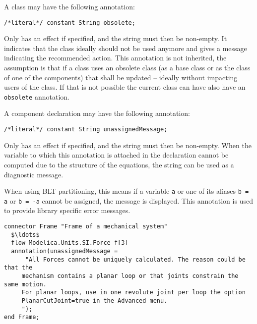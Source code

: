A class may have the following annotation:
\begin{lstlisting}[language=modelica]
/*literal*/ constant String obsolete;
\end{lstlisting}%

Only has an effect if specified, and the string must then be non-empty.
It indicates that the class ideally should not be used anymore and gives a message indicating the recommended action.
This annotation is not inherited, the assumption is that if a class uses an obsolete class (as a base class or as the class of one of the components) that shall be updated -- ideally without impacting users of the class.
If that is not possible the current class can have also have an \lstinline!obsolete! annotation.

A component declaration may have the following annotation:
\begin{lstlisting}[language=modelica]
/*literal*/ constant String unassignedMessage;
\end{lstlisting}%

Only has an effect if specified, and the string must then be non-empty.
When the variable to which this annotation is attached in the declaration cannot be computed due to the structure of the equations, the string can be used as a diagnostic message.

\begin{nonnormative}
When using BLT partitioning, this means if a variable \lstinline!a! or one of its aliases \lstinline!b = a! or \lstinline!b = -a! cannot be assigned, the message is displayed.
This annotation is used to provide library specific error messages.
\end{nonnormative}

\begin{example}
\begin{lstlisting}[language=modelica]
connector Frame "Frame of a mechanical system"
  $\ldots$
  flow Modelica.Units.SI.Force f[3]
  annotation(unassignedMessage =
      "All Forces cannot be uniquely calculated. The reason could be that the
     mechanism contains a planar loop or that joints constrain the same motion.
     For planar loops, use in one revolute joint per loop the option
     PlanarCutJoint=true in the Advanced menu.
     ");
end Frame;
\end{lstlisting}
\end{example}

